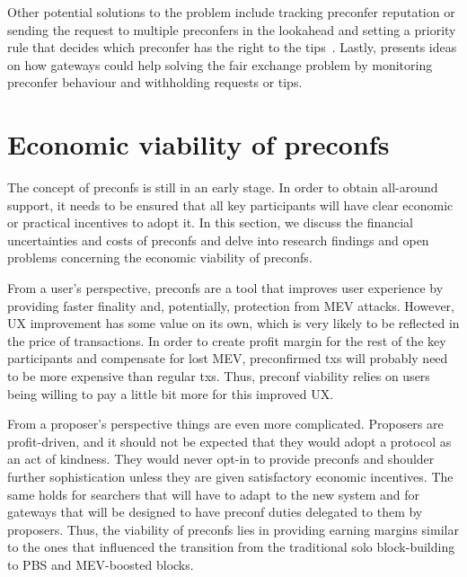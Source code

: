 \documentclass[conference]{IEEEtran}
\theoremstyle{boldstyle}
\begin{document}
    Other potential solutions to the problem include tracking preconfer reputation or sending the request to multiple preconfers in the lookahead and setting a priority rule that decides which preconfer has the right to the tips~\cite{W:SolutionstothePreconfFairExchangeProblem}. Lastly, \cite{W:ThePreconfirmationGatewayUnlockingPreconfirmations:FromUsertoPreconfer} presents ideas on how gateways could help solving the fair exchange problem by monitoring preconfer behaviour and withholding requests or tips.



\section{Economic viability of preconfs}
    The concept of preconfs is still in an early stage. In order to obtain all-around support, it needs to be ensured that all key participants will have clear economic or practical incentives to adopt it. In this section, we discuss the financial uncertainties and costs of preconfs and delve into research findings and open problems concerning the economic viability of preconfs. 
    
    From a user's perspective, preconfs are a tool that improves user experience by providing faster finality and, potentially, protection from MEV attacks. However, UX improvement has some value on its own, which is very likely to be reflected in the price of transactions. In order to create profit margin for the rest of the key participants and compensate for lost MEV, preconfirmed txs will probably need to be more expensive than regular txs. Thus, preconf viability relies on users being willing to pay a little bit more for this improved UX. 

    From a proposer's perspective things are even more complicated. Proposers are profit-driven, and it should not be expected that they would adopt a protocol as an act of kindness. They would never opt-in to provide preconfs and shoulder further sophistication unless they are given satisfactory economic incentives. The same holds for searchers that will have to adapt to the new system and for gateways that will be designed to have preconf duties delegated to them by proposers. Thus, the viability of preconfs lies in providing earning margins similar to the ones that influenced the transition from the traditional solo block-building to PBS and MEV-boosted blocks.
\end{document}
